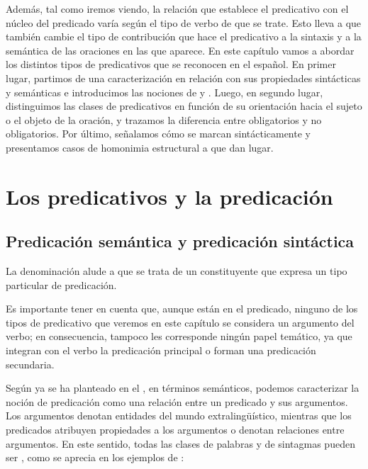 Además, tal como iremos viendo, la relación que establece el predicativo con el
núcleo del predicado varía según el tipo de verbo de que se trate. Esto lleva a
que también cambie el tipo de contribución que hace el predicativo a la sintaxis
y a la semántica de las oraciones en las que aparece. En este capítulo vamos a
abordar los distintos tipos de predicativos que se reconocen en el español. En
primer lugar, partimos de una caracterización en relación con sus propiedades
sintácticas y semánticas e introducimos las nociones de  y . Luego, en segundo lugar,
distinguimos las clases de predicativos en función de su orientación hacia el
sujeto o el objeto de la oración, y trazamos la diferencia entre obligatorios y
no obligatorios. Por último, señalamos cómo se marcan sintácticamente y
presentamos casos de homonimia estructural a que dan lugar.

\section{Los predicativos y la predicación}\label{sec:09-predicacion}

\subsection{Predicación semántica y predicación sintáctica}

La denominación  alude a que se trata de un constituyente que
expresa un tipo particular de predicación.

\begin{destacado}
Es importante tener en cuenta que, aunque están en el predicado, ninguno de los
tipos de predicativo que veremos en este capítulo se considera un argumento del
verbo; en consecuencia, tampoco les corresponde ningún papel temático, ya que
integran con el verbo la predicación principal o forman una predicación
secundaria.
\end{destacado}

Según ya se ha planteado en el , en términos semánticos, podemos
caracterizar la noción de predicación como una relación entre un predicado y sus
argumentos. Los argumentos denotan entidades del mundo extralingüístico,
mientras que los predicados atribuyen propiedades a los argumentos o denotan
relaciones entre argumentos. En este sentido, todas las clases de palabras y de
sintagmas pueden ser , como se aprecia en los
ejemplos de :

